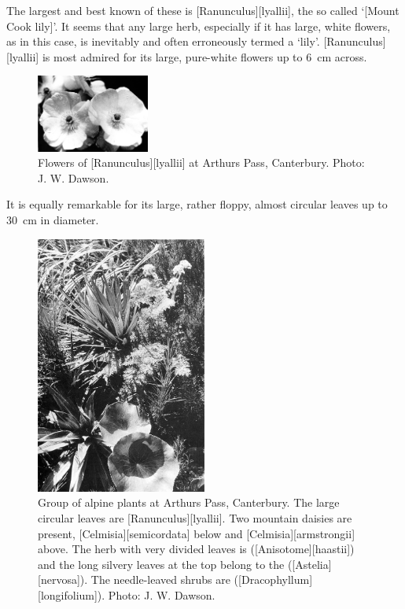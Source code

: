 The largest and best known of these is [Ranunculus][lyallii], the so called `[Mount Cook lily]'.
It seems that any large herb, especially if it has large, white flowers, as in this case, is inevitably and often erroneously termed a `lily'. [Ranunculus][lyallii] is most admired for its large, pure-white flowers up to \SI{6}{\centi\metre} across.
\begin{figure}
	\includegraphics[width=0.33\textwidth]{graphics/figure99ranunculus.jpg}
	\centering
	\caption[Flowers of \emph{Ranunculus lyallii}]{Flowers of [Ranunculus][lyallii] at Arthurs Pass, Canterbury.
	Photo: J. W. Dawson.}%
	\label{fig:99ranunculus}
\end{figure}
It is equally remarkable for its large, rather floppy, almost circular leaves up to \SI{30}{\centi\metre} in diameter.
\begin{figure}
	\includegraphics[width=0.5\textwidth]{graphics/figure100alpine-plants.jpg}
	\centering
	\caption[Alpine plants at Arthurs Pass]{Group of alpine plants at Arthurs Pass, Canterbury.
	The large circular leaves are [Ranunculus][lyallii].
	Two mountain daisies are present, [Celmisia][semicordata] below and [Celmisia][armstrongii] above.
	The herb with very divided leaves is  ([Anisotome][haastii]) and the long silvery leaves at the top belong to the  ([Astelia][nervosa]).
	The needle-leaved shrubs are  ([Dracophyllum][longifolium]).
	Photo: J. W. Dawson.}%
	\label{fig:100alpine-plants}
\end{figure}
